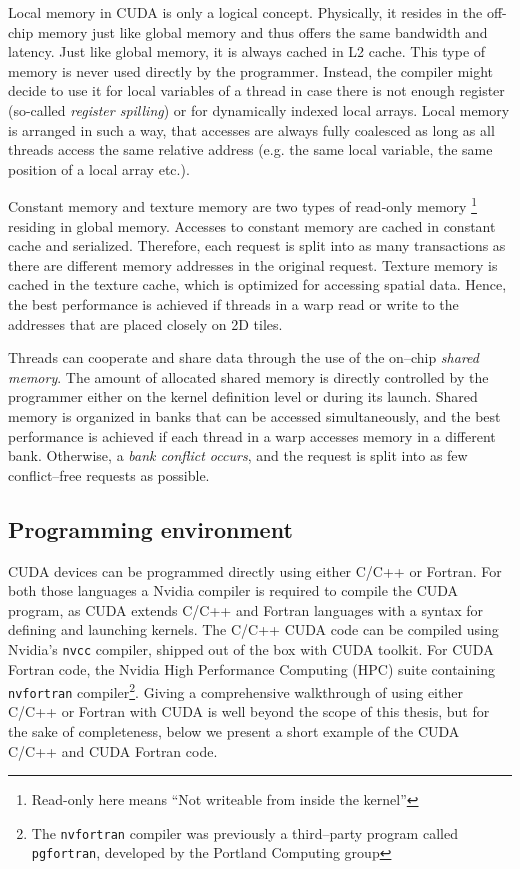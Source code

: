 Local memory in CUDA is only a logical concept. Physically, it resides in the off-chip memory just
like global memory and thus offers the same bandwidth and latency. Just like
global memory, it is always cached in L2 cache. This type of memory is never used directly by the
programmer. Instead, the compiler might decide to use it for local variables of a thread in case
there is not enough register (so-called \emph{register spilling}) or for dynamically indexed local
arrays. Local memory is arranged in such a way, that accesses are always fully coalesced as long as
all threads access the same relative address (e.g. the same local variable, the same position of a
local array etc.).

Constant memory and texture memory are two types of read-only memory \footnote{Read-only here means
``Not writeable from inside the kernel''} residing in global memory. Accesses to constant memory are
cached in constant cache and serialized. Therefore, each request is split into as many transactions
as there are different memory addresses in the original request. Texture memory is cached in the
texture cache, which is optimized for accessing spatial data. Hence, the best performance is
achieved if threads in a warp read or write to the addresses that are placed closely on 2D tiles.

Threads can cooperate and share data through the use of the on--chip \emph{shared memory}. The amount of allocated shared memory is directly controlled by the programmer either on the kernel definition level or during its launch. Shared memory is organized in banks that can be accessed simultaneously, and the best performance is achieved if each thread in a warp accesses memory in a different bank. Otherwise, a \emph{bank conflict occurs}, and the request is split into as few conflict--free requests as possible.


\subsection{Programming environment}
CUDA devices can be programmed directly using either C/C++ or Fortran. For both those languages a
Nvidia compiler is required to compile the CUDA program, as CUDA extends C/C++ and Fortran languages
with a syntax for defining and launching kernels. The C/C++ CUDA code can be compiled using Nvidia's
\texttt{nvcc} compiler, shipped out of the box with CUDA toolkit. For CUDA Fortran code, the Nvidia
High Performance Computing (HPC) suite containing \texttt{nvfortran} compiler\footnote{The
\texttt{nvfortran} compiler was previously a third--party program called \texttt{pgfortran},
developed by the Portland Computing group}. Giving a comprehensive walkthrough of using either
C/C++ or Fortran with CUDA is well beyond the scope of this thesis, but for the sake of
completeness, below we present a short example of the CUDA C/C++ and CUDA Fortran code.

